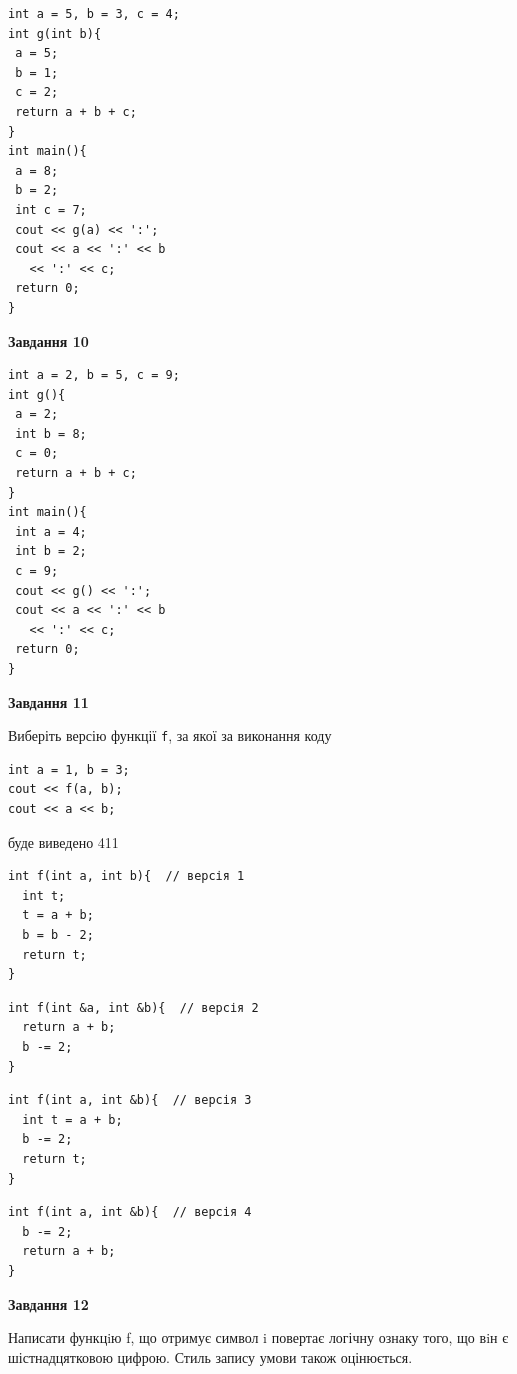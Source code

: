 \documentclass[12pt, ukrainian]{article}
\def\code#1{\Verb!#1!}
\begin{document}
{\begin {large}
\begin{minipage}[t]{7.0cm}
\begin{verbatim}
int a = 5, b = 3, c = 4;
int g(int b){
 a = 5;
 b = 1;
 c = 2;
 return a + b + c;
}
int main(){
 a = 8;
 b = 2;
 int c = 7;
 cout << g(a) << ':';
 cout << a << ':' << b 
   << ':' << c;
 return 0;
}
\end{verbatim}



\begin{center}
\textbf{Завдання 10}
\end{center}
\vspace{-8mm}

\begin{verbatim}
int a = 2, b = 5, c = 9;
int g(){
 a = 2;
 int b = 8;
 c = 0;
 return a + b + c;
}
int main(){
 int a = 4;
 int b = 2;
 c = 9;
 cout << g() << ':';
 cout << a << ':' << b 
   << ':' << c;
 return 0;
}
\end{verbatim}

\end{minipage}
\vline \hspace{1mm}
\begin{minipage}[t]{11.0cm}

\begin{center}
\textbf{Завдання 11}
\end{center}
Виберіть версію функції \code{f}, за якої за виконання коду
\begin{verbatim}
int a = 1, b = 3;
cout << f(a, b);
cout << a << b;
\end{verbatim}

буде виведено 411

\begin{verbatim}
int f(int a, int b){  // версія 1
  int t;
  t = a + b;
  b = b - 2;
  return t;
}
\end{verbatim}

\vspace{-8mm}\begin{verbatim}
int f(int &a, int &b){  // версія 2
  return a + b;
  b -= 2;
}
\end{verbatim}

\vspace{-8mm}\begin{verbatim}
int f(int a, int &b){  // версія 3
  int t = a + b;
  b -= 2;
  return t;
}
\end{verbatim}

\vspace{-8mm}\begin{verbatim}
int f(int a, int &b){  // версія 4
  b -= 2;
  return a + b;
}
\end{verbatim}



\begin{center}
\textbf{Завдання 12}
\end{center}

Написати функцiю f, що отримує символ i повертає логічну ознаку того, що вiн є шістнадцятковою цифрою. Стиль запису умови також оцінюється.\par

\end{minipage}

\end {large}}
\newpage
\end{document}
